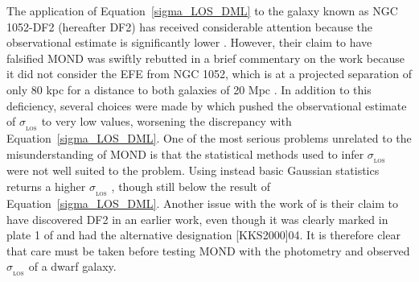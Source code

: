 \documentclass[fleqn,usenatbib,useAMS,onecolumn]{mnras} %
\begin{document}
The application of Equation~\ref{sigma_LOS_DML} to the galaxy known as NGC 1052-DF2 (hereafter DF2) has received considerable attention because the observational estimate is significantly lower \citep{Van_Dokkum_2018}. However, their claim to have falsified MOND was swiftly rebutted in a brief commentary on the work because it did not consider the EFE from NGC 1052, which is at a projected separation of only 80 kpc \citep{Kroupa_2018_DF2} for a distance to both galaxies of 20 Mpc \citep{Shen_2021}. In addition to this deficiency, several choices were made by \citet{Van_Dokkum_2018} which pushed the observational estimate of $\sigma_{_\text{LOS}}$ to very low values, worsening the discrepancy with Equation~\ref{sigma_LOS_DML}. One of the most serious problems unrelated to the misunderstanding of MOND is that the statistical methods used to infer $\sigma_{_\text{LOS}}$ were not well suited to the problem. Using instead basic Gaussian statistics returns a higher $\sigma_{_\text{LOS}}$ \citep{Martin_2018, Haghi_2019_DF2}, though still below the result of Equation~\ref{sigma_LOS_DML}. Another issue with the work of \citet{Van_Dokkum_2018} is their claim to have discovered DF2 in an earlier work, even though it was clearly marked in plate 1 of \citet{Fosbury_1978} and had the alternative designation [KKS2000]04. It is therefore clear that care must be taken before testing MOND with the photometry and observed $\sigma_{_\text{LOS}}$ of a dwarf galaxy.
\end{document}
